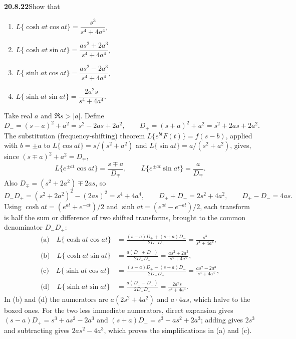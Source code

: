 \par\bigskip
\noindent\textbf{20.8.22}\quad Show that
\begin{enumerate}
\item[(a)] $L\{\cosh at\cos at\}=\dfrac{s^{3}}{s^{4}+4a^{4}}$,
\item[(b)] $L\{\cosh at\sin at\}=\dfrac{as^{2}+2a^{3}}{s^{4}+4a^{4}}$,
\item[(c)] $L\{\sinh at\cos at\}=\dfrac{as^{2}-2a^{3}}{s^{4}+4a^{4}}$,
\item[(d)] $L\{\sinh at\sin at\}=\dfrac{2a^{2}s}{s^{4}+4a^{4}}$.
\end{enumerate}
\par{}
\solution
Take real $a$ and $\Re s>|a|$. Define
\[
D_-=(s-a)^2+a^2=s^2-2as+2a^2,\qquad
D_+=(s+a)^2+a^2=s^2+2as+2a^2.
\]
The substitution (frequency-shifting) theorem
$L\{e^{bt}F(t)\}=f(s-b)$, applied with $b=\pm a$ to
$L\{\cos at\}=s/(s^2+a^2)$ and $L\{\sin at\}=a/(s^2+a^2)$,
gives, since $(s\mp a)^2+a^2=D_\mp$,
\[
L\{e^{\pm at}\cos at\}=\frac{s\mp a}{D_\mp},\qquad
L\{e^{\pm at}\sin at\}=\frac a{D_\mp}.
\]
Also $D_\mp=(s^2+2a^2)\mp2as$, so
\[
D_-D_+=(s^2+2a^2)^2-(2as)^2=s^4+4a^4,\qquad
D_++D_-=2s^2+4a^2,\qquad D_+-D_-=4as.
\]
Using $\cosh at=(e^{at}+e^{-at})/2$ and
$\sinh at=(e^{at}-e^{-at})/2$, each transform is half the sum
or difference of two shifted transforms, brought to the common
denominator $D_-D_+$:
\begin{align*}
\text{(a)}\quad L\{\cosh at\cos at\}
&=\frac{(s-a)D_++(s+a)D_-}{2D_-D_+}
=\boxed{\frac{s^3}{s^4+4a^4}},\\
\text{(b)}\quad L\{\cosh at\sin at\}
&=\frac{a(D_++D_-)}{2D_-D_+}
=\boxed{\frac{as^2+2a^3}{s^4+4a^4}},\\
\text{(c)}\quad L\{\sinh at\cos at\}
&=\frac{(s-a)D_+-(s+a)D_-}{2D_-D_+}
=\boxed{\frac{as^2-2a^3}{s^4+4a^4}},\\
\text{(d)}\quad L\{\sinh at\sin at\}
&=\frac{a(D_+-D_-)}{2D_-D_+}
=\boxed{\frac{2a^2s}{s^4+4a^4}}.
\end{align*}
In (b) and (d) the numerators are
$a(2s^2+4a^2)$ and $a\cdot4as$, which halve to the boxed ones.
For the two less immediate numerators, direct expansion gives
$(s-a)D_+=s^3+as^2-2a^3$ and
$(s+a)D_-=s^3-as^2+2a^3$; adding gives $2s^3$ and subtracting
gives $2as^2-4a^3$, which proves the simplifications in (a)
and (c).

